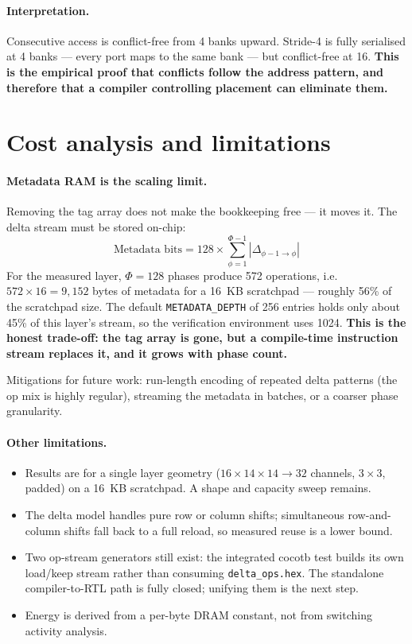 \documentclass[11pt,a4paper]{article}
\begin{document}
\paragraph{Interpretation.} Consecutive access is conflict-free from 4 banks
upward. Stride-4 is fully serialised at 4 banks --- every port maps to the same
bank --- but conflict-free at 16. \textbf{This is the empirical proof that
conflicts follow the address pattern, and therefore that a compiler controlling
placement can eliminate them.}

\section{Cost analysis and limitations}

\paragraph{Metadata RAM is the scaling limit.} Removing the tag array does not
make the bookkeeping free --- it moves it. The delta stream must be stored
on-chip:
\begin{equation}
  \text{Metadata bits} = 128 \times \sum_{\phi=1}^{\Phi-1} |\Delta_{\phi-1 \to \phi}|
\end{equation}
For the measured layer, $\Phi = 128$ phases produce 572 operations, i.e.
$572 \times 16 = 9{,}152$ bytes of metadata for a 16~KB scratchpad --- roughly
56\% of the scratchpad size. The default \texttt{METADATA\_DEPTH} of 256
entries holds only about 45\% of this layer's stream, so the verification
environment uses 1024. \textbf{This is the honest trade-off: the tag array is
gone, but a compile-time instruction stream replaces it, and it grows with
phase count.}

Mitigations for future work: run-length encoding of repeated delta patterns
(the op mix is highly regular), streaming the metadata in batches, or a coarser
phase granularity.

\paragraph{Other limitations.}
\begin{itemize}[leftmargin=1.4em,itemsep=2pt]
  \item Results are for a single layer geometry
        ($16\times14\times14 \to 32$ channels, $3\times3$, padded) on a 16~KB
        scratchpad. A shape and capacity sweep remains.
  \item The delta model handles pure row or column shifts; simultaneous
        row-and-column shifts fall back to a full reload, so measured reuse is
        a lower bound.
  \item Two op-stream generators still exist: the integrated cocotb test builds
        its own load/keep stream rather than consuming
        \texttt{delta\_ops.hex}. The standalone compiler-to-RTL path is fully
        closed; unifying them is the next step.
  \item Energy is derived from a per-byte DRAM constant, not from switching
        activity analysis.
\end{itemize}
\end{document}
